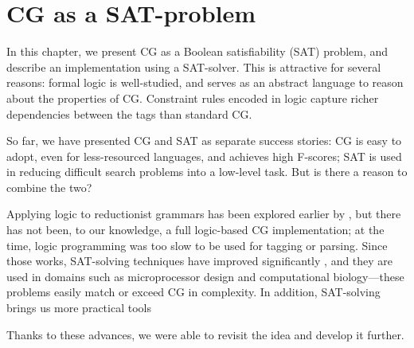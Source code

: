 \def\la{\text{\em la}}
\def\casa{\text{\em casa}}
\def\grande{\text{\em grande}}

\def\det{{\text{\sc Det}}}
\def\prn{{\text{\sc  Prn}}}
\def\n{{\text{\sc N}}}
\def\v{{\text{\sc V}}}
\def\adj{{\text{\sc Adj}}}

\def\laDet{\la_\det}
\def\laPrn{\la_\prn}
\def\casaN{\casa_\n}
\def\casaV{\casa_\v}
\def\grandeAdj{\grande_\adj}

\def\t#1{\texttt{#1}}
\def\ob#1{\overbrace{ #1 \rule{0pt}{2ex}}}
\def\cgrule#1{{\ttfamily #1}}

\def\defRule{``do not remove the last reading''}


\chapter{CG as a SAT-problem}
\label{chapterCGSAT}

In this chapter, we present CG as a Boolean satisfiability (SAT) problem,
and describe an implementation using a SAT-solver. 
This is attractive for several reasons: formal logic is
well-studied, and serves as an abstract language to reason about the
properties of CG. Constraint rules encoded in logic capture richer
dependencies between the tags than standard CG. 


So far, we have presented CG and SAT as separate success stories: CG is easy to adopt, even for less-resourced languages, and achieves high F-scores; SAT is used in reducing difficult search problems into a low-level task.
But is there a reason to combine the two? 

Applying logic to reductionist grammars has been explored earlier by \cite{lager98,lager_nivre01}, but there has not been, to our knowledge, a full logic-based CG implementation; at the time, logic programming was too slow to be used for tagging or parsing. 
Since those works, SAT-solving techniques have improved significantly \cite{marques_silva2010}, and they are used in domains such as microprocessor design and computational 
biology---these problems easily match or exceed CG in complexity. 
In addition, SAT-solving brings us more practical tools

Thanks to these advances, we were able to revisit the idea and develop it further. 


